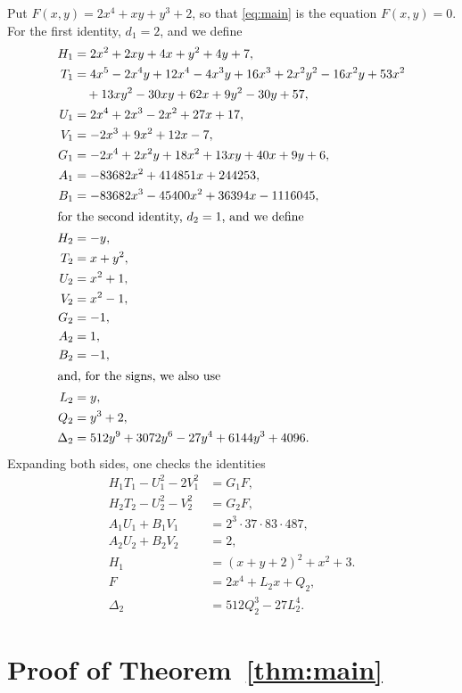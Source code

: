 \documentclass[11pt]{article}
\begin{document}
Put $F(x,y)=2x^{4}+xy+y^{3}+2$, so that \eqref{eq:main} is the equation $F(x,y)=0$.
For the first identity, $d_{1}=2$, and we define
\begin{align*}
H_{1}&=2x^{2}+2xy+4x+y^{2}+4y+7,\\
T_{1}&=4x^{5}-2x^{4}y+12x^{4}-4x^{3}y+16x^{3}+2x^{2}y^{2}-16x^{2}y+53x^{2}\\
&\quad+13xy^{2}-30xy+62x+9y^{2}-30y+57,\\
U_{1}&=2x^{4}+2x^{3}-2x^{2}+27x+17,\\
V_{1}&=-2x^{3}+9x^{2}+12x-7,\\
G_{1}&=-2x^{4}+2x^{2}y+18x^{2}+13xy+40x+9y+6,\\
A_{1}&=-83682x^{2}+414851x+244253,\\
B_{1}&=-83682x^{3}-45400x^{2}+36394x-1116045,\\
\intertext{for the second identity, $d_{2}=1$, and we define}
H_{2}&=-y,\\
T_{2}&=x+y^{2},\\
U_{2}&=x^{2}+1,\\
V_{2}&=x^{2}-1,\\
G_{2}&=-1,\\
A_{2}&=1,\\
B_{2}&=-1,\\
\intertext{and, for the signs, we also use}
L_{2}&=y,\\
Q_{2}&=y^{3}+2,\\
\Delta_{2}&=512y^{9}+3072y^{6}-27y^{4}+6144y^{3}+4096.
\end{align*}
Expanding both sides, one checks the identities
\begin{align}
H_{1}T_{1}-U_{1}^2-2V_{1}^2&=G_{1}F,\label{eq:norm1}\\
H_{2}T_{2}-U_{2}^2-V_{2}^2&=G_{2}F,\label{eq:norm2}\\
A_{1}U_{1}+B_{1}V_{1}&=2^{3}\cdot 37\cdot 83\cdot 487,\label{eq:bez1}\\
A_{2}U_{2}+B_{2}V_{2}&=2,\label{eq:bez2}\\
H_{1}&=(x+y+2)^2+x^2+3.\label{eq:sign1}\\
F&=2x^4+L_{2}x+Q_{2},\label{eq:sign2}\\
\Delta_{2}&=512Q_{2}^3-27L_{2}^4.\label{eq:sign2b}
\end{align}

\section{Proof of Theorem~\ref{thm:main}}
\end{document}

